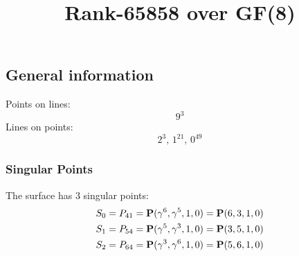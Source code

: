 \documentclass{article}
\newcommand\setTBstruts{\def\T{\rule{0pt}{2.6ex}}%
\def\B{\rule[-1.2ex]{0pt}{0pt}}}
\newcommand{\bP}{{\bf P}}
\begin{document}
 
\setTBstruts



{\allowdisplaybreaks%






\title{Rank-65858 over GF(8)}
\author{}%
\maketitle%
%
{}



\subsection*{General information}
Points on lines:
$$
9^3$$
Lines on points:
$$
2^3,\,1^{21},\,0^{49}$$
\subsubsection*{Singular Points}
The surface has 3 singular points:\\
\begin{align*}
S_{0} &= P_{41}=\bP(\gamma^{6}, \gamma^{5}, 1, 0) = \bP(6, 3, 1, 0)\\
S_{1} &= P_{54}=\bP(\gamma^{5}, \gamma^{3}, 1, 0) = \bP(3, 5, 1, 0)\\
S_{2} &= P_{64}=\bP(\gamma^{3}, \gamma^{6}, 1, 0) = \bP(5, 6, 1, 0)\\
\end{align*}
}
\end{document}
